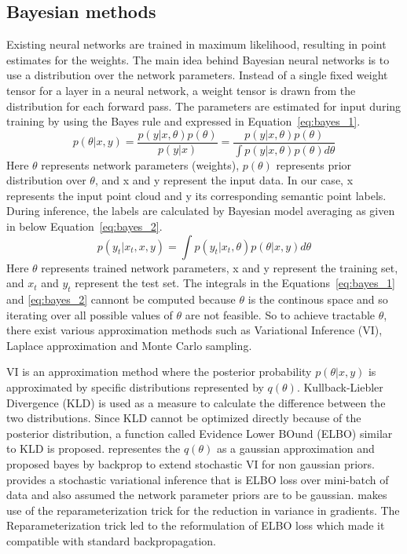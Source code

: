     \subsection{Bayesian methods}
    Existing neural networks are trained in maximum likelihood, resulting in point estimates for the weights.
    The main idea behind Bayesian neural networks is to use a distribution over the network parameters.
    Instead of a single fixed weight tensor for a layer in a neural network, a weight tensor is drawn from the distribution for each forward pass.
    The parameters are estimated for input during training by using the Bayes rule and expressed in Equation~\ref{eq:bayes_1}.
    \begin{equation}
        p(\theta|x, y) = \frac{p(y|x, \theta)p(\theta)}{p(y|x)} = \frac{p(y|x, \theta)p(\theta)}{\int p(y|x, \theta) p(\theta) d\theta} \label{eq:bayes_1}
    \end{equation}
    Here $\theta$ represents network parameters (weights), $p(\theta)$ represents prior distribution over $\theta$, and x and y represent the input data. In our case, x represents the input point cloud and y its corresponding semantic point labels.
    During inference, the labels are calculated by Bayesian model averaging as given in below Equation~\ref{eq:bayes_2}.
    \begin{equation}
        p(y_t|x_t, x, y) = \int p(y_t|x_t, \theta)p(\theta|x, y)d\theta \label{eq:bayes_2}  
    \end{equation}
    Here $\theta$ represents trained network parameters, x and y represent the training set, and $x_t$ and $y_t$ represent the test set.
    The integrals in the Equations~\ref{eq:bayes_1} and \ref{eq:bayes_2} cannont be computed because $\theta$ is the continous space and so iterating over all possible values of $\theta$ are not feasible.
    So to achieve tractable $\theta$, there exist various approximation methods such as Variational Inference (VI), Laplace approximation and Monte Carlo sampling.

    VI is an approximation method where the posterior probability $p(\theta|x, y)$ is approximated by specific distributions represented by $q(\theta)$.
    Kullback-Liebler Divergence (KLD) is used as a measure to calculate the difference between the two distributions. 
    Since KLD cannot be optimized directly because of the posterior distribution, a function called Evidence Lower BOund (ELBO) similar to KLD is proposed.
    \cite{Gaussian_Priors} representes the $q(\theta)$ as a gaussian approximation and \cite{weight_uncertainty} proposed bayes by backprop to extend stochastic VI for non gaussian priors.
    \cite{Non_Gaussian_Priors} provides a stochastic variational inference that is ELBO loss over mini-batch of data and also assumed the network parameter priors are to be gaussian.
    \cite{Flipout} makes use of the reparameterization trick for the reduction in variance in gradients. The Reparameterization trick led to the reformulation of ELBO loss which made it compatible with standard backpropagation.

